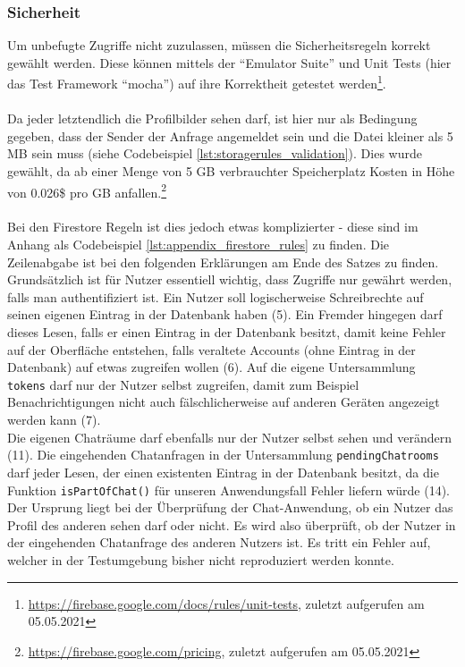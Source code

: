 \subsubsection{Sicherheit}
Um unbefugte Zugriffe nicht zuzulassen, müssen die Sicherheitsregeln korrekt gewählt werden.
Diese können mittels der \enquote{Emulator Suite} und Unit Tests (hier das Test Framework \enquote{mocha}) auf ihre Korrektheit getestet werden\footnote{\url{https://firebase.google.com/docs/rules/unit-tests}, zuletzt aufgerufen am 05.05.2021}.\\
\\
Da jeder letztendlich die Profilbilder sehen darf, ist hier nur als Bedingung gegeben, dass der Sender der Anfrage angemeldet sein und die Datei kleiner als 5 MB sein muss (siehe Codebeispiel \ref{lst:storagerules_validation}). 
Dies wurde gewählt, da ab einer Menge von 5 GB verbrauchter Speicherplatz Kosten in Höhe von 0.026\$ pro GB anfallen.\footnote{\url{https://firebase.google.com/pricing}, zuletzt aufgerufen am 05.05.2021}\\
\\
Bei den Firestore Regeln ist dies jedoch etwas komplizierter - diese sind im Anhang als Codebeispiel \ref{lst:appendix_firestore_rules} zu finden.
Die Zeilenabgabe ist bei den folgenden Erklärungen am Ende des Satzes zu finden.
Grundsätzlich ist für Nutzer essentiell wichtig, dass Zugriffe nur gewährt werden, falls man authentifiziert ist.
Ein Nutzer soll logischerweise Schreibrechte auf seinen eigenen Eintrag in der Datenbank haben (5).
Ein Fremder hingegen darf dieses Lesen, falls er einen Eintrag in der Datenbank besitzt, damit keine Fehler auf der Oberfläche entstehen, falls veraltete Accounts (ohne Eintrag in der Datenbank) auf etwas zugreifen wollen (6).
Auf die eigene Untersammlung \texttt{tokens} darf nur der Nutzer selbst zugreifen, damit zum Beispiel Benachrichtigungen nicht auch fälschlicherweise auf anderen Geräten angezeigt werden kann (7).\\
Die eigenen Chaträume darf ebenfalls nur der Nutzer selbst sehen und verändern (11).
Die eingehenden Chatanfragen in der Untersammlung \texttt{pendingChatrooms} darf jeder Lesen, der einen existenten Eintrag in der Datenbank besitzt, da die Funktion \texttt{isPartOfChat()} für unseren Anwendungsfall Fehler liefern würde (14).
Der Ursprung liegt bei der Überprüfung der Chat-Anwendung, ob ein Nutzer das Profil des anderen sehen darf oder nicht.
Es wird also überprüft, ob der Nutzer in der eingehenden Chatanfrage des anderen Nutzers ist.
Es tritt ein Fehler auf, welcher in der Testumgebung bisher nicht reproduziert werden konnte.
